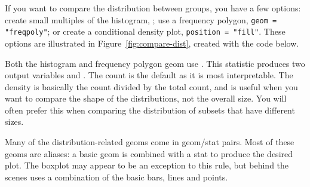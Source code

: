 If you want to compare the distribution between groups, you have a few options: create small multiples of the histogram, ; use a frequency polygon, {\tt geom = "freqpoly"}; or create a conditional density plot, {\tt position = "fill"}. These options are illustrated in Figure~\ref{fig:compare-dist}, created with the code below.

% 


\noindent Both the histogram and frequency polygon geom use .  This statistic produces two output variables  and .  The count is the default as it is most interpretable.  The density is basically the count divided by the total count, and is useful when you want to compare the shape of the distributions, not the overall size.  You will often prefer this when comparing the distribution of subsets that have different sizes.

Many of the distribution-related geoms come in geom/stat pairs.  Most of these geoms are aliases: a basic geom is combined with a stat to produce the desired plot.  The boxplot may appear to be an exception to this rule, but behind the scenes  uses a combination of the basic bars, lines and points.

